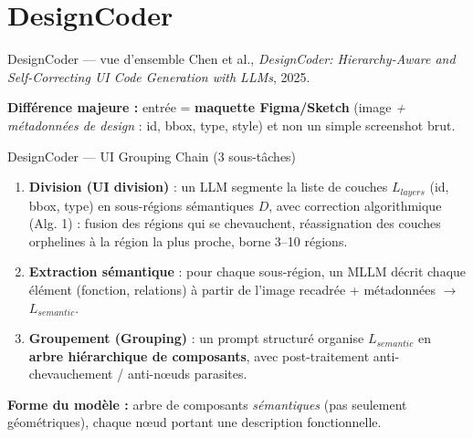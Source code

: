 \documentclass[10pt,aspectratio=169]{beamer}
\begin{document}
\section{DesignCoder}
\begin{frame}{DesignCoder --- vue d'ensemble}
\footnotesize Chen et al., \emph{DesignCoder: Hierarchy-Aware and Self-Correcting UI Code Generation with LLMs}, 2025.

\vspace{2mm}
\textbf{Différence majeure :} entrée = \textbf{maquette Figma/Sketch} (image \emph{+ métadonnées de design} : id, bbox, type, style) et non un simple screenshot brut.

\begin{center}
\end{center}
\end{frame}

\begin{frame}{DesignCoder --- UI Grouping Chain (3 sous-tâches)}
\begin{enumerate}
  \item \textbf{Division (UI division)} : un LLM segmente la liste de couches $L_{layers}$ (id, bbox, type) en sous-régions sémantiques $D$, avec correction algorithmique (Alg. 1) : fusion des régions qui se chevauchent, réassignation des couches orphelines à la région la plus proche, borne 3--10 régions.
  \item \textbf{Extraction sémantique} : pour chaque sous-région, un MLLM décrit chaque élément (fonction, relations) à partir de l'image recadrée + métadonnées $\to$ $L_{semantic}$.
  \item \textbf{Groupement (Grouping)} : un prompt structuré organise $L_{semantic}$ en \textbf{arbre hiérarchique de composants}, avec post-traitement anti-chevauchement / anti-n\oe uds parasites.
\end{enumerate}
\textbf{Forme du modèle :} arbre de composants \emph{sémantiques} (pas seulement géométriques), chaque n\oe ud portant une description fonctionnelle.
\end{frame}
\end{document}
